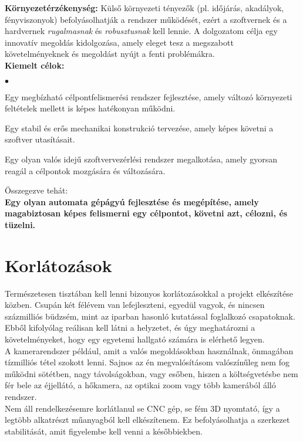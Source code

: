 \textbf{Környezetérzékenység:} Külső környezeti tényezők (pl. időjárás, akadályok, fényviszonyok) befolyásolhatják a rendszer működését, ezért a szoftvernek és a hardvernek \textsl{rugalmasnak} és \textsl{robusztusnak} kell lennie. A dolgozatom célja egy innovatív megoldás kidolgozása, amely eleget tesz a megszabott követelményeknek és megoldást nyújt a fenti problémákra. \\

\textbf{Kiemelt célok:}
\begin{list}{$\bullet$}{}
	\item Egy megbízható célpontfelismerési rendszer fejlesztése, amely változó környezeti feltételek mellett is képes hatékonyan működni.
	\item Egy stabil és erős mechanikai konstrukció tervezése, amely képes követni a szoftver utasításait.
	\item Egy olyan valós idejű szoftvervezérlési rendszer megalkotása, amely gyorsan reagál a célpontok mozgására és változására.
\end{list}

Összegezve tehát: \\

\textbf{Egy olyan automata gépágyú fejlesztése és megépítése, amely magabiztosan képes felismerni egy célpontot, követni azt, célozni, és tüzelni.}

\section{Korlátozások}

Természetesen tisztában kell lenni bizonyos korlátozásokkal a projekt elkészítése közben. Csupán két félévem van lefejleszteni, egyedül vagyok, és nincsen százmilliós büdzsém, mint az iparban hasonló kutatással foglalkozó csapatoknak. Ebből kifolyólag reálisan kell látni a helyzetet, és úgy meghatározni a követelményeket, hogy egy egyetemi hallgató számára is elérhető legyen. \\

A kamerarendszer például, amit a valós megoldásokban használnak, önmagában tízmilliós tétel szokott lenni. Sajnos az én megvalósításom valószínűleg nem fog működni sötétben, nagy távolságokban, vagy esőben, hiszen a költségvetésbe nem fér bele az éjjellátó, a hőkamera, az optikai zoom vagy több kamerából álló rendszer.\\

Nem áll rendelkezésemre korlátlanul se CNC gép, se fém 3D nyomtató, így a legtöbb alkatrészt műanyagból kell elkészítenem. Ez befolyásolhatja a szerkezet stabilitását, amit figyelembe kell venni a későbbiekben.\\

